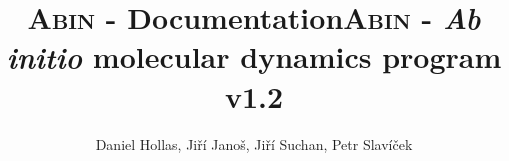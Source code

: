 \documentclass[12pt,a4paper]{article}
\author{Daniel Hollas, Ji\v{r}\'{i} Jano\v{s}, Ji\v{r}\'{i} Suchan, Petr Slav\'{i}\v{c}ek}
\title{\textsc{Abin} - Documentation}
\title{\textsc{Abin} -  \textit{Ab initio} molecular dynamics program \\ v1.2}
\begin{document}
\maketitle

\newcommand{\abin}{\textsc{Abin} }

\tableofcontents
\newpage



\clearpage


\clearpage


\clearpage


\clearpage


\clearpage


\end{document}

